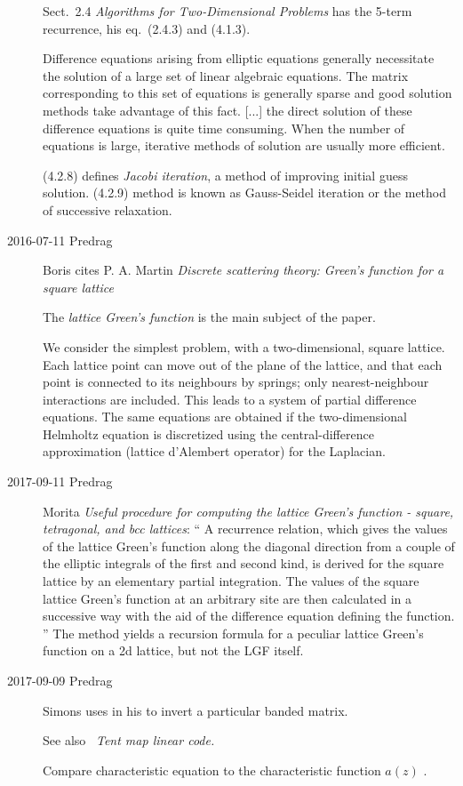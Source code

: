 \begin{description}
Sect.~2.4 {\em Algorithms for Two-Dimensional Problems}
has the 5-term recurrence, his eq.~(2.4.3) and (4.1.3).

Difference equations arising from elliptic equations generally
necessitate the solution of a large set of linear algebraic equations.
The matrix corresponding to this set of equations is generally sparse and
good solution methods take advantage of this fact.
[...]
the direct solution of these difference equations is quite time
consuming. When the number of equations is large, iterative methods of
solution are usually more efficient.

(4.2.8) defines \emph{Jacobi iteration}, a method of improving initial
guess solution.
(4.2.9) method is known as Gauss-Seidel iteration or the method of
successive relaxation.



\item[2016-07-11 Predrag]
Boris cites P. A. Martin {\em Discrete scattering theory: {Green}'s
function for a square lattice}

The \emph{lattice Green's function} is the main subject of the paper.

We consider the simplest problem, with a two-dimensional, square lattice.
Each lattice point can move out of the plane of the lattice, and that each
point is connected to its neighbours by springs; only nearest-neighbour
interactions are included. This leads to a system of partial difference
equations. The same equations are obtained if the two-dimensional Helmholtz
equation is discretized using the central-difference approximation (lattice
d'Alembert operator) for the Laplacian.

\item[2017-09-11 Predrag]
Morita {\em Useful procedure for computing the lattice
{Green's} function - square, tetragonal, and bcc lattices}: `` A
recurrence relation, which gives the values of the lattice Green's
function along the diagonal direction from a couple of the elliptic
integrals of the first  and second kind, is derived
for the square lattice by an elementary partial integration. The values
of the square lattice Green's function at an arbitrary site are then
calculated in a successive way with the aid of the difference equation
defining the function.
''
The method yields a recursion formula for a peculiar lattice Green's function
on a 2d lattice, but not the LGF itself.


\item[2017-09-09 Predrag]
Simons
uses  in his  to
invert a particular banded matrix.

See also ~{\em Tent map linear code.}

Compare {characteristic equation}  to the
characteristic function $a(z)$ .

\end{description}

